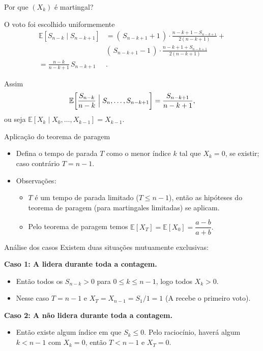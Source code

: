 \documentclass{beamer}
\begin{document}
\begin{frame}{Por que $(X_k)$ é  martingal?}

  O voto foi  escolhido uniformemente 
  \[
    \begin{split}
    \mathbb{E}[S_{n-k}\mid S_{n-k+1}]
    &=
    (\,S_{n-k+1}+1\,) \cdot \frac{n-k+1-S_{n-k+1}}{2(n-k+1)}
    + \\ &
    (\,S_{n-k+1}-1\,)\cdot \frac{n-k+1+S_{n-k+1}}{2(n-k+1)}\\       
    = \frac{n-k}{n-k+1}\,S_{n-k+1}&.
  \end{split}
  \]

  Assim
  \[
    \mathbb{E}\!\left[\frac{S_{n-k}}{n-k}\Bigm\vert S_n,\dots,S_{n-k+1}\right]
    =\frac{S_{n-k+1}}{n-k+1},
  \]
  ou seja \(\mathbb{E}[X_k\mid X_0,\dots,X_{k-1}]=X_{k-1}.\)
\end{frame}

\begin{frame}{Aplicação do teorema de paragem}
  \begin{itemize}\itemsep=1cm
  \item Defina o tempo de parada \(T\) como o menor índice \(k\) tal
    que \(X_k=0\), se existir; caso contrário \(T=n-1\).
    \item Observações:
      \begin{itemize}\itemsep=.5cm
        \item $T$ é um tempo de parada limitado (\(T\le n-1\)), então as hipóteses do teorema de paragem (para martingales limitadas) se aplicam.
        \item Pelo teorema de paragem temos \(\mathbb{E}[X_T]=\mathbb{E}[X_0]=\dfrac{a-b}{a+b}.\)
      \end{itemize}
  \end{itemize}
\end{frame}

\begin{frame}{Análise dos casos}
  Existem duas situações mutuamente exclusivas:

  \medskip
  \textbf{Caso 1: A lidera durante toda a contagem.}
  \begin{itemize}
    \item Então todos os \(S_{n-k}>0\) para \(0\le k\le n-1\), logo todos \(X_k>0\).
    \item Nesse caso \(T=n-1\) e \(X_T=X_{n-1}=S_1/1=1\) (A recebe o primeiro voto).
  \end{itemize}

  \medskip
  \textbf{Caso 2: A não lidera durante toda a contagem.}
  \begin{itemize}
    \item Então existe algum índice em que \(S_k\le 0\). Pelo raciocínio, haverá algum \(k<n-1\) com \(X_k=0\), então \(T< n-1\) e \(X_T=0\).
  \end{itemize}
\end{frame}
\end{document}
